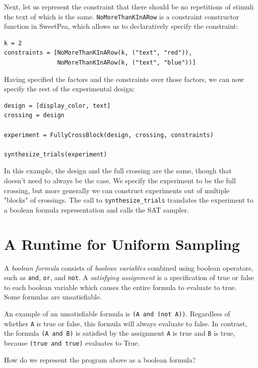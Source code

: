 Next, let us represent the constraint that there should be no repetitions of stimuli the text of which is the same. \texttt{NoMoreThanKInARow} is a constraint constructor function in SweetPea, which allows us to declaratively specify the constraint:

\begin{verbatim}
k = 2
constraints = [NoMoreThanKInARow(k, ("text", "red")),
               NoMoreThanKInARow(k, ("text", "blue"))]
\end{verbatim}

Having specified the factors and the constraints over those factors, we can now specify the rest of the experimental design:

\begin{verbatim}
design = [display_color, text]
crossing = design

experiment = FullyCrossBlock(design, crossing, constraints)

synthesize_trials(experiment)
\end{verbatim}

In this example, the design and the full crossing are the same, though that doesn't need to always be the case. We specify the experiment to be the full crossing, but more generally we can construct experiments out of multiple "blocks" of crossings. The call to \texttt{synthesize\_trials} translates the experiment to a boolean formula representation and calls the SAT sampler.

\section{A Runtime for Uniform Sampling}

A \emph{boolean formula} consists of \emph{boolean variables} combined using boolean operators, such as \texttt{and}, \texttt{or}, and \texttt{not}. A \emph{satisfying assignment} is a specification of true or false to each boolean variable which causes the entire formula to evaluate to true. Some formulas are unsatisfiable.

An example of an unsatisfiable formula is \texttt{(A and (not A))}. Regardless of whether \texttt{A} is true or false, this formula will always evaluate to false. In contrast, the formula \texttt{(A and B)} is satisfied by the assignment \texttt{A} is true and \texttt{B} is true, because \texttt{(true and true)} evaluates to True.

How do we represent the program above as a boolean formula?


